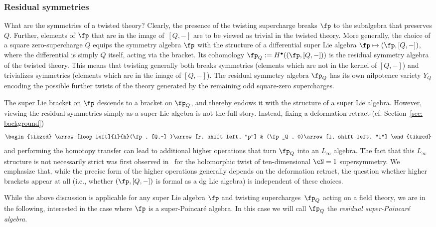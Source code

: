 \documentclass[10pt,a4paper]{amsart}
\numberwithin{equation}{section}
\theoremstyle{definition}
\begin{document}
\subsubsection{Residual symmetries}
What are the symmetries of a twisted theory? Clearly, the presence of the twisting supercharge breaks $\fp$ to the subalgebra that preserves $Q$. Further, elements of $\fp$ that are in the image of~${[Q,-]}$ are to be viewed as trivial in the twisted theory. More generally, the choice of a square zero-supercharge $Q$ equips the symmetry algebra $\fp$ with the structure of a differential super Lie algebra
$
 \fp \mapsto (\fp, [Q,-])$,
where the differential is simply $Q$ itself, acting via the bracket.
Its cohomology $\fp_Q := H^\bullet((\fp ,[Q,-]))$ is the residual symmetry algebra of the twisted theory. This means that twisting generally both breaks symmetries (elements which are not in the kernel of $[Q,-]$) and trivializes symmetries (elements which are in the image of $[Q,-]$). The residual symmetry algebra $\fp_Q$ has its own nilpotence variety $Y_{Q}$ encoding the possible further twists of the theory generated by the remaining odd square-zero supercharges.

The super Lie bracket on $\fp$ descends to a bracket on $\fp_Q$, and thereby endows it with the structure of a super Lie algebra. However, viewing the residual symmetries simply as a super Lie algebra is not the full story. Instead, fixing a deformation retract (cf. Section~\ref{sec: background})
\[
	\begin{tikzcd}
	\arrow[loop left]{l}{h}(\fp , [Q,-] )\arrow[r, shift left, "p"] & (\fp_Q , 0)\arrow[l, shift left, "i"]
	\end{tikzcd}
\]
and performing the homotopy transfer can lead to additional higher operations that turn $\fp_Q$ into an $L_\infty$ algebra. The fact that this $L_\infty$ structure is not necessarily strict was first observed in~\cite{JKY} for the holomorphic twist of ten-dimensional $\cN=1$ supersymmetry.
We emphasize that, while the precise form of the higher operations generally depends on the deformation retract, the question whether higher brackets appear at all (i.e., whether $(\fp, [Q,-])$ is formal as a dg Lie algebra) is independent of these choices.

While the above discussion is applicable for any super Lie algebra $\fp$ and twisting supercharges~$\fp_Q$ acting on a field theory, we are in the following, interested in the case where $\fp$ is a super-Poincar\'e algebra. In this case we will call $\fp_Q$ the \emph{residual super-Poincar\'e algebra}.
\end{document}
